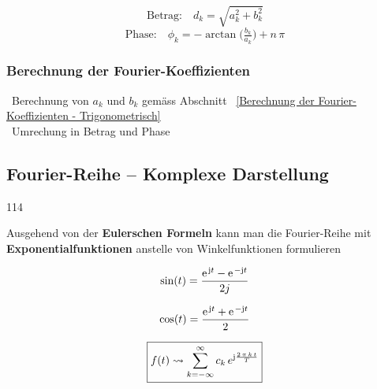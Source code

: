 \begin{minipage}[c]{0.62\columnwidth}
    $$ \text{Betrag:} \quad d_k = \sqrt{a_k^2 + b_k^2} $$
    $$ \text{Phase:} \quad \phi_k = -\arctan \big( \tfrac{b_k}{a_k} \big) + n \, \pi $$
\end{minipage}
\hfill
\begin{minipage}[c]{0.3\columnwidth}
    \centering
\end{minipage}


\subsubsection{Berechnung der Fourier-Koeffizienten}

\textrightarrow\ Berechnung von $a_k$ und $b_k$ gemäss Abschnitt ~\ref{Berechnung der Fourier-Koeffizienten - Trigonometrisch} \\
\textrightarrow\ Umrechung in Betrag und Phase

	
\subsection{Fourier-Reihe -- Komplexe Darstellung}{114}

Ausgehend von der \textbf{Eulerschen Formeln} kann man die Fourier-Reihe mit \textbf{Exponentialfunktionen} anstelle von Winkelfunktionen formulieren

\vspace{0.2cm}

\begin{minipage}{0.48\columnwidth}
    $$ \sin(t) = \frac{\e^{\jimg t} - \e^{- \jimg t}}{2j} $$ 
\end{minipage}
\hfill
\begin{minipage}{0.48\columnwidth}
    $$ \cos(t) = \frac{\e^{\jimg t} + \e^{- \jimg t}}{2} $$
\end{minipage}

\vspace{0.2cm}

$$  \boxed{ f(t) \rightsquigarrow \sum\limits_{k=-\infty}^\infty c_k \, e^{\mathrm{j} \frac{2 \, \pi \, k \, t}{T}} } $$


